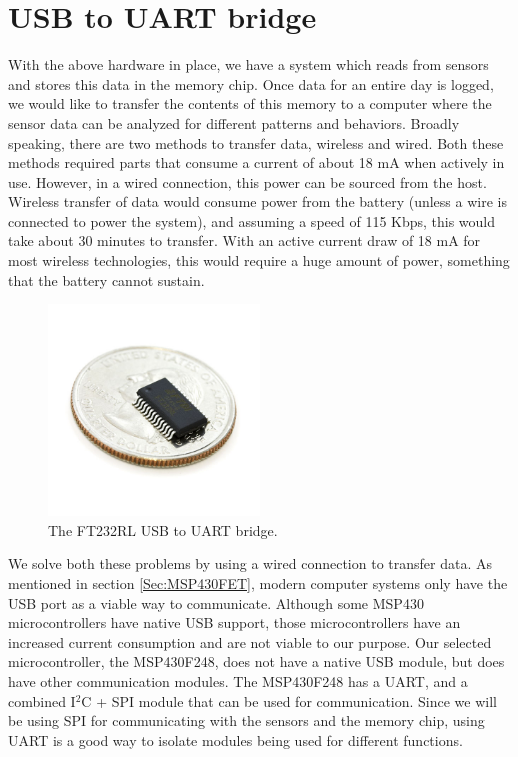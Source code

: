 \section{USB to UART bridge}
\label{Sec:FT232}
With the above hardware in place,
we have a system which reads from sensors and stores this data in the memory chip.
Once data for an entire day is logged,
we would like to transfer the contents of this memory
to a computer where the sensor data can be analyzed for different patterns and behaviors.
Broadly speaking, there are two methods to transfer data, wireless and wired.
Both these methods required parts that consume a current of about 18 mA when actively in use.
However, in a wired connection, this power can be sourced from the host.
Wireless transfer of data would consume power from the battery
(unless a wire is connected to power the system), and assuming a speed of 115 Kbps,
this would take about 30 minutes to transfer.
With an active current draw of 18 mA for most wireless technologies,
this would require a huge amount of power, something that the battery cannot sustain.
\begin{figure}
\begin{center}
\includegraphics[width=0.5\textwidth]{images/FT232coin.jpg}
\caption{The FT232RL USB to UART bridge.}
\label{Fig:FT232}
\end{center}
\end{figure}

We solve both these problems by using a wired connection to transfer data. As mentioned in section \ref{Sec:MSP430FET}, modern computer systems only have the USB port as a viable way to communicate. Although some MSP430 microcontrollers have native USB support, those microcontrollers have an increased current consumption and are not viable to our purpose. Our selected microcontroller, the MSP430F248, does not have a native USB module, but does have other communication modules. The MSP430F248 has a UART, and a combined I$^2$C + SPI module that can be used for communication. Since we will be using SPI for communicating with the sensors and the memory chip, using UART is a good way to isolate modules being used for different functions.

